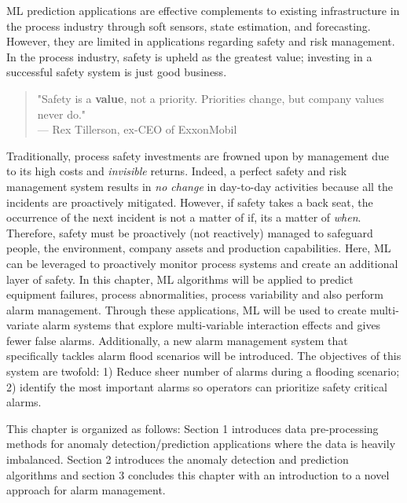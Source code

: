 %
% 

ML prediction applications are effective complements to existing infrastructure in the process industry through soft sensors, state estimation, and forecasting. However, they are limited in applications regarding safety and risk management.  In the process industry, safety is upheld as the greatest value; investing in a successful safety system is just good business.  

\begin{quote}
    "Safety is a \textbf{value}, not a priority.  Priorities change, but company values never do." \\
    --- Rex Tillerson, ex-CEO of ExxonMobil
\end{quote}

Traditionally, process safety investments are frowned upon by management due to its high costs and \textit{invisible} returns. Indeed, a perfect safety and risk management system results in \textit{no change} in day-to-day activities because all the incidents are proactively mitigated.  However, if safety takes a back seat, the occurrence of the next incident is not a matter of if, its a matter of \textit{when}. Therefore, safety must be proactively (not reactively) managed to safeguard people, the environment, company assets and production capabilities. Here, ML can be leveraged to proactively monitor process systems and create an additional layer of safety. In this chapter, ML algorithms will be applied to predict equipment failures, process abnormalities, process variability and also perform alarm management. Through these applications, ML will be used to create multi-variate alarm systems that explore multi-variable interaction effects and gives fewer false alarms. Additionally, a new alarm management system that specifically tackles alarm flood scenarios will be introduced.  The objectives of this system are twofold: 1) Reduce sheer number of alarms during a flooding scenario; 2) identify the most important alarms so operators can prioritize safety critical alarms.

This chapter is organized as follows: Section 1 introduces data pre-processing methods for anomaly detection/prediction applications where the data is heavily imbalanced.  Section 2 introduces the anomaly detection and prediction algorithms and section 3 concludes this chapter with an introduction to a novel approach for alarm management.

